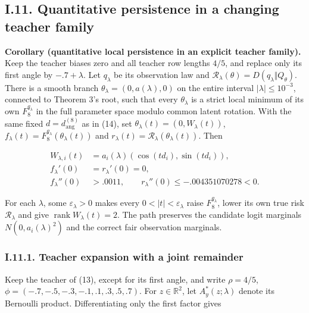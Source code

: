 \documentclass{article}
\begin{document}
\subsection*{I.11. Quantitative persistence in a changing teacher
family}\label{quantitative-teacher-family}

\protect{}\label{teacher-family-full-statement}
\textbf{Corollary (quantitative local persistence in an explicit teacher
family).} Keep the teacher biases zero and all teacher row lengths
\(4/5\), and replace only its first angle by \(-.7+\lambda\). Let
\(q_\lambda\) be its observation law and
\(\mathcal R_\lambda(\theta)=D(q_\lambda\Vert Q_\theta)\). There is a
smooth branch \(\theta_\lambda=(0,a(\lambda),0)\) on the entire interval
\(|\lambda|\le10^{-3}\), connected to Theorem 3's root, such that every
\(\theta_\lambda\) is a strict local minimum of its own
\(F_8^{q_\lambda}\) in the full parameter space modulo common latent
rotation. With the same fixed \(d=d_{\mathrm{ang}}^{(8)}\) as in (14),
set \(\theta_\lambda(t)=(0,W_\lambda(t))\),
\(f_\lambda(t)=F_8^{q_\lambda}(\theta_\lambda(t))\) and
\(r_\lambda(t)=\mathcal R_\lambda(\theta_\lambda(t))\). Then

\[
\begin{aligned}
W_{\lambda,i}(t)&=a_i(\lambda)(\cos(td_i),\sin(td_i)),\\
f_\lambda'(0)&=r_\lambda'(0)=0,\\
f_\lambda''(0)&>.0011,\qquad
r_\lambda''(0)\le-.004351070278<0.
\end{aligned}
\]

For each \(\lambda\), some \(\varepsilon_\lambda>0\) makes every
\(0<|t|<\varepsilon_\lambda\) raise \(F_8^{q_\lambda}\), lower its own
true risk \(\mathcal R_\lambda\) and give
\(\operatorname{rank}W_\lambda(t)=2\). The path preserves the candidate
logit marginals \(N(0,a_i(\lambda)^2)\) and the correct fair observation
marginals.

\subsubsection*{I.11.1. Teacher expansion with a joint
remainder}\label{i.11.1.-teacher-expansion-with-a-joint-remainder}

Keep the teacher of (13), except for its first angle, and write
\(\rho=4/5\), \(\phi=(-.7,-.5,-.3,-.1,.1,.3,.5,.7)\). For
\(z\in\mathbb R^2\), let \(A_y^*(z;\lambda)\) denote its Bernoulli
product. Differentiating only the first factor gives
\end{document}
